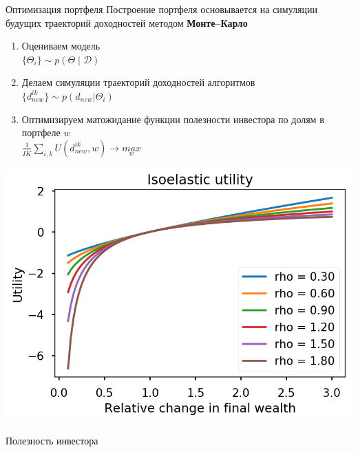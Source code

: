 \documentclass[12pt]{beamer}
\newcommand{\cond}{\;|\;}
\begin{document}
\begin{frame}{Оптимизация портфеля}
Построение портфеля основывается на симуляции будущих траекторий доходностей методом \textbf{Монте--Карло}

\begin{minipage}{0.49\linewidth}
	\begin{enumerate}
		\item Оцениваем модель\\$\{\Theta_i\}\sim p(\Theta\cond\mathcal{D})$
		\item Делаем симуляции траекторий  доходностей алгоритмов\\$\{d_{new}^{ik}\} \sim p(d_{new}|\Theta_i)$ 
		\item Оптимизируем матожидание функции полезности инвестора по долям в портфеле $w$\\
		$\tfrac{1}{I\dot K}\sum_{i, k}U(d^{ik}_{new}, w)\to \underset{w}{max}$
	\end{enumerate}
\end{minipage}
\begin{minipage}{0.49\linewidth}
	\includegraphics[width=\linewidth]{isoelastic}
	\centering
	
	Полезность инвестора
\end{minipage}
\end{frame}
\end{document}
